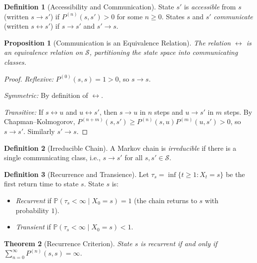 \documentclass[11pt,a4paper]{article}
\theoremstyle{definition}
\newtheorem{definition}{Definition}[section]
\theoremstyle{plain}
\newtheorem{theorem}{Theorem}[section]
\newtheorem{proposition}[theorem]{Proposition}
\theoremstyle{remark}
\newcommand{\Prob}{\mathbb{P}}
\begin{document}
\begin{definition}[Accessibility and Communication]
\label{def:accessibility}
State $s'$ is \emph{accessible} from $s$ (written $s \to s'$) if $P^{(n)}(s, s') > 0$ for some $n \geq 0$. States $s$ and $s'$ \emph{communicate} (written $s \leftrightarrow s'$) if $s \to s'$ and $s' \to s$.
\end{definition}

\begin{proposition}[Communication is an Equivalence Relation]
\label{prop:communication}
The relation $\leftrightarrow$ is an equivalence relation on $\mathcal{S}$, partitioning the state space into \emph{communicating classes}.
\end{proposition}

\begin{proof}
\textit{Reflexive:} $P^{(0)}(s, s) = 1 > 0$, so $s \to s$.

\textit{Symmetric:} By definition of $\leftrightarrow$.

\textit{Transitive:} If $s \leftrightarrow u$ and $u \leftrightarrow s'$, then $s \to u$ in $n$ steps and $u \to s'$ in $m$ steps. By Chapman--Kolmogorov, $P^{(n+m)}(s, s') \geq P^{(n)}(s, u) P^{(m)}(u, s') > 0$, so $s \to s'$. Similarly $s' \to s$.
\end{proof}

\begin{definition}[Irreducible Chain]
\label{def:irreducible}
A Markov chain is \emph{irreducible} if there is a single communicating class, i.e., $s \to s'$ for all $s, s' \in \mathcal{S}$.
\end{definition}

\begin{definition}[Recurrence and Transience]
\label{def:recurrence}
Let $\tau_s = \inf\{t \geq 1 : X_t = s\}$ be the first return time to state $s$. State $s$ is:
\begin{itemize}[nosep]
    \item \emph{Recurrent} if $\Prob(\tau_s < \infty \mid X_0 = s) = 1$ (the chain returns to $s$ with probability $1$).
    \item \emph{Transient} if $\Prob(\tau_s < \infty \mid X_0 = s) < 1$.
\end{itemize}
\end{definition}

\begin{theorem}[Recurrence Criterion]
\label{thm:recurrence}
State $s$ is recurrent if and only if $\sum_{n=0}^\infty P^{(n)}(s, s) = \infty$.
\end{theorem}
\end{document}

